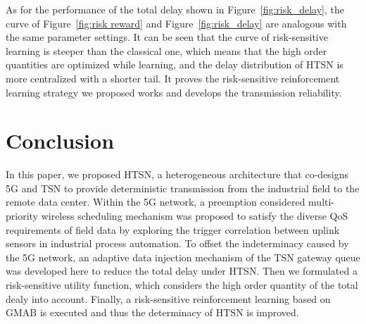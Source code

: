 \documentclass{SCIS2021}
\begin{document}
	\par As for the performance of the total delay shown in Figure~\ref{fig:risk_delay}, the curve of Figure~\ref{fig:risk reward} and Figure~\ref{fig:risk_delay} are analogous with the same parameter settings. It can be seen that the curve of risk-sensitive learning is steeper than the classical one, which means that the high order quantities are optimized while learning, and the delay distribution of HTSN is more centralized with a shorter tail. It proves the risk-sensitive reinforcement learning strategy we proposed works and develops the transmission reliability.
	
	
	\section{Conclusion} 
	\label{con}
	\par In this paper, we proposed HTSN, a heterogeneous architecture that co-designs 5G and TSN to provide deterministic transmission from the industrial field to the remote data center. Within the 5G network, a preemption considered multi-priority wireless scheduling mechanism was proposed to satisfy the diverse QoS requirements of field data by exploring the trigger correlation between uplink sensors in industrial process automation. To offset the indeterminacy caused by the 5G network, an adaptive data injection mechanism of the TSN gateway queue was developed here to reduce the total delay under HTSN. Then we formulated a risk-sensitive utility function, which considers the high order quantity of the total dealy into account. Finally, a risk-sensitive reinforcement learning based on GMAB is executed and thus the determinacy of HTSN is improved.
	
	
	
	
	
	
	
	
	
\end{document}
